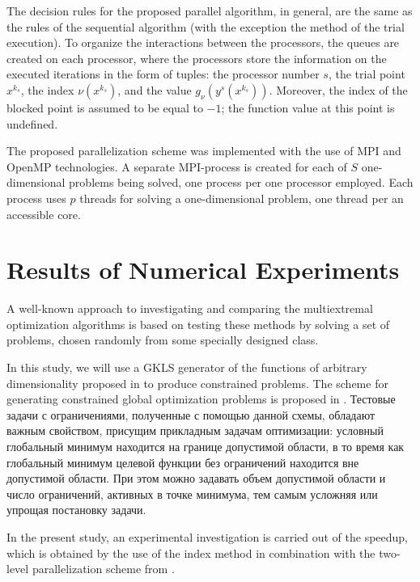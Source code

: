 \documentclass[smallextended]{svjour3}       %
\begin{document}
The decision rules for the proposed parallel algorithm, in general, are the same as the rules of the sequential algorithm (with the exception the method of the trial execution). To organize the interactions between the processors, the queues are created on each processor, where the processors store the information on the executed iterations in the form of tuples: the processor number $s$, the trial point $x^{k_s}$, the index $\nu(x^{k_s})$, and the value $g_\nu(y^s (x^{k_s} ) )$. Moreover, the index of the blocked point is assumed to be equal to $-1$; the function value at this point is undefined.

The proposed parallelization scheme was implemented with the use of MPI and OpenMP technologies. A separate MPI-process is created for each of $S$ one-dimensional problems being solved, one process per one processor employed. Each process uses $p$ threads for solving a one-dimensional problem, one thread per an accessible core.

\section{Results of Numerical Experiments}
\label{sec:4}

A well-known approach to investigating and comparing the multiextremal optimization algorithms is based on testing these methods by solving a set of problems, chosen randomly from some specially designed class.

In this study, we will use a GKLS generator of the functions of arbitrary dimensionality proposed in \cite{Gaviano2003} to produce constrained problems. The scheme for generating constrained global optimization problems is proposed in \cite{Gergel2017}. 
\Russian
Тестовые задачи с ограничениями, полученные с помощью данной схемы, обладают важным свойством, присущим прикладным задачам оптимизации: условный глобальный минимум находится на границе допустимой области, в то время как глобальный минимум целевой функции без ограничений находится вне допустимой области. При этом можно задавать объем допустимой области и  число ограничений, активных в точке минимума, тем самым усложняя или упрощая постановку задачи.

In the present study, an experimental investigation is carried out of the speedup, which is obtained by the use of the index method in combination with the two-level parallelization scheme from \cite{Sidorov2015}.
\end{document}
